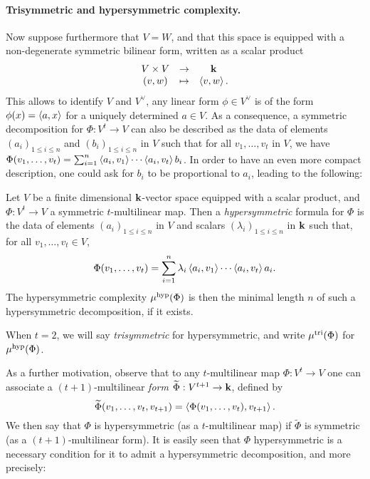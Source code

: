 \documentclass[11pt]{article}
\begin{document}
\paragraph{Trisymmetric and hypersymmetric complexity.}
Now suppose furthermore that $V=W$, and that this space is equipped with a
non-degenerate symmetric bilinear form, written as a scalar product
\[
\begin{array}{ccc}
V\times V &\to&\mathbf{k}\\
(v,w)&\mapsto&\left\langle v,w\right\rangle.
\end{array}
\]
This allows to identify $V$ and $V^\vee$, \ie any linear form $\phi\in V^\vee$
is of the form $\phi(x)=\left\langle a,x\right\rangle$ for a uniquely determined $a\in V$.
As a consequence, a symmetric decomposition for $\Phi:V^t\to V$ can also be described
as the data of elements $(a_i)_{1\leq i\leq n}$ and $(b_i)_{1\leq i\leq n}$ in $V$
such that for all $v_1,\dots,v_t$ in $V$,
we have $\Phi(v_1,\dots,v_t)=\sum_{i=1}^{n}\left\langle a_i,v_1\right\rangle\cdots\left\langle a_i,v_t\right\rangle b_i$.
In order to have an even more compact description, one could ask for $b_i$ to be proportional to $a_i$, leading to the following:
\begin{defi}
Let $V$ be a finite dimensional $\mathbf{k}$-vector space equipped with a scalar product,
and $\Phi:V^t\to V$ a symmetric $t$-multilinear map.
Then a \emph{hypersymmetric} formula for $\Phi$ is the data of
elements $(a_i)_{1\leq i\leq n}$ in $V$ and scalars $(\lambda_i)_{1\leq i\leq n}$ in $\mathbf{k}$ such that, for all $v_1,\dots,v_t\in V$,
\[
\Phi(v_1,\dots,v_t)=\sum_{i=1}^{n}\lambda_i\left\langle a_i,v_1\right\rangle\cdots\left\langle a_i,v_t\right\rangle a_i.
\]
The hypersymmetric complexity $\mu^{\textrm{hyp}}(\Phi)$ is then the minimal length $n$ of such a hypersymmetric decomposition, if it exists.

When $t=2$, we will say \emph{trisymmetric} for hypersymmetric,
and write $\mu^{\textrm{tri}}(\Phi)$ for $\mu^{\textrm{hyp}}(\Phi)$.
\end{defi}
As a further motivation, observe that to any $t$-multilinear map $\Phi:V^t\to V$
one can associate a $(t+1)$-multilinear \emph{form} $\widetilde{\Phi}:V^{t+1}\to \mathbf{k}$, defined by
\[
\widetilde{\Phi}(v_1,\dots,v_t,v_{t+1})=\left\langle\Phi(v_1,\dots,v_t),v_{t+1}\right\rangle.
\]
We then say that $\Phi$ is hypersymmetric (as a $t$-multilinear map)
if $\widetilde{\Phi}$ is symmetric (as a $(t+1)$-multilinear form).
It is easily seen that $\Phi$ hypersymmetric is a necessary condition for it to admit a hypersymmetric decomposition, and more precisely:
\end{document}
